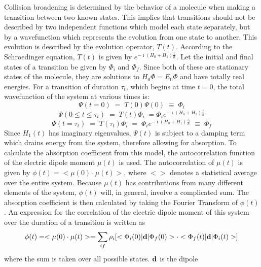 \documentclass[11pt]{article}
\begin{document}
Collision broadening is determined by the behavior of a molecule when
making a transition between two known states.  This implies that 
transitions should not be described by two independent functions which 
model each state separately, but by a wavefunction which represents the 
evolution from one state to another.  This evolution is described by the
evolution operator, $T(t)$.  According to the Schroedinger equation, $T(t)$ 
is given by $e^{-\imath(H_{0}+H_{1})\frac{t}{\hbar}}$.
Let the initial and final states of a transition be given by $\Phi_{i}$ and
$\Phi_{f}$.  Since both of these are stationary states of
the molecule, they are solutions to $H_{0}\Phi=E_{0}\Phi$ and have totally 
real energies.  For a transition of duration $\tau_{t}$, which begins
at time $t=0$, the total wavefunction of the system at various times is:
\begin{equation} 
  \Psi(t=0) \; = \; T(0)\Psi(0) \; \equiv \; \Phi_{i}
\end{equation}
\begin{equation} 
  \Psi(0\leq t\leq\tau_{t}) \; = \; T(t)\Phi_{i} \; = \Phi_{i}
e^{-\imath(H_{0}+H_{1})\frac{t}{\hbar}}
\end{equation}
\begin{equation} 
  \Psi(t=\tau_{t}) \; = \; T(\tau_{t})\Phi_{i} \; = \; \Phi_{i}
e^{-\imath(H_{0}+H_{1})\frac{\tau_{t}}{\hbar}} \; \equiv \; \Phi_{f}
\end{equation}
Since $H_{1}(t)$ has imaginary eigenvalues, $\Psi(t)$ is subject to a
damping term which drains energy from the system, therefore allowing for
absorption.  To calculate the absorption coefficient from this model, the 
autocorrelation function of the electric dipole moment $\mu(t)$ is used.
The autocorrelation of $\mu(t)$ is given by
$\phi(t)=<\mu(0)\cdot\mu(t)>$, where $< >$ denotes a statistical average 
over the entire system.  Because $\mu(t)$ has contributions from
many different elements of the system, $\phi(t)$ will, in general, involve 
a complicated sum.  The absorption coefficient is then calculated by 
taking the Fourier Transform of $\phi(t)$ \cite{ bir:82}.  An
expression for the correlation of the electric dipole moment of this system
over the duration of a transition is written as \cite{bar:58}
\begin{equation} 
\phi(t)= <\mu(0)\cdot\mu(t)>= \sum_{if} \rho_{i}[<\Phi_{i}(0)|{
\bf
  d}|\Phi_{f}(0)>\cdot <\Phi_{f}(t)|{\bf d}|\Phi_{i}(t)>]
\end{equation}
where the sum is taken over all possible states.  ${\bf d}$ is the dipole
\end{document}
